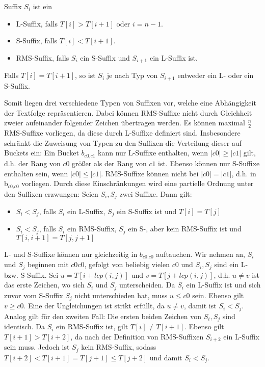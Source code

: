 \begin{definition}
	Suffix $S_i$ ist ein
	\begin{itemize}
		\item L-Suffix, falls $T[i] > T[i+1]$ oder $i=n-1$.
		\item S-Suffix, falls $T[i] < T[i+1]$.
		\item RMS-Suffix, falls $S_i$ ein S-Suffix und $S_{i+1}$ ein L-Suffix ist.
	\end{itemize}
	Falls $T[i] = T[i+1]$, so ist $S_i$ je nach Typ von $S_{i+1}$ entweder ein L- oder ein S-Suffix.
\end{definition}

Somit liegen drei verschiedene Typen von Suffixen vor, welche eine Abhängigkeit der Textfolge repräsentieren. Dabei können RMS-Suffixe nicht durch Gleichheit zweier aufeinander folgender Zeichen übertragen werden. Es können maximal $\frac{n}{2}$ RMS-Suffixe vorliegen, da diese durch L-Suffixe definiert sind. Insbesondere schränkt die Zuweisung von Typen zu den Suffixen die Verteilung dieser auf Buckets ein: Ein Bucket $b_{\textit{c0,c1}}$ kann nur L-Suffixe enthalten, wenn $|c0| \geq |c1|$ gilt, d.h. der Rang von $c0$ größer als der Rang von $c1$ ist. Ebenso können nur S-Suffixe enthalten sein, wenn $|c0| \leq |c1|$. RMS-Suffixe können nicht bei $|c0|=|c1|$, d.h. in b$_{\textit{c0,c0}}$ vorliegen.
Durch diese Einschränkungen wird eine partielle Ordnung unter den Suffixen erzwungen:
	Seien $S_i, S_j$ zwei Suffixe. Dann gilt:
	\begin{itemize}
		\item $S_i < S_j$, falls $S_i$ ein L-Suffix, $S_j$ ein S-Suffix ist und $T[i] = T[j]$
		\item $S_i < S_j$, falls $S_i$ ein RMS-Suffix, $S_j$ ein S-, aber kein RMS-Suffix ist und $T[i, i+1] = T[j, j+1]$
	\end{itemize}

	L- und S-Suffixe können nur gleichzeitig in $b_{\textit{c0,c0}}$ auftauchen. Wir nehmen an, $S_i$ und $S_j$ beginnen mit $c0c0$, gefolgt von beliebig vielen $c0$ und $S_i, S_j$ sind ein L- bzw. S-Suffix. Sei $u = T[i+lcp(i, j)]$ und $v = T[j+lcp(i, j)]$, d.h. $u \neq v$ ist das erste Zeichen, wo sich $S_i$ und $S_j$ unterscheiden. Da $S_i$ ein L-Suffix ist und sich zuvor vom S-Suffix $S_j$ nicht unterschieden hat, muss $u \leq c0$ sein. Ebenso gilt $v \geq c0$. Eine der Ungleichungen ist strikt erfüllt, da $u \neq v$, damit ist $S_i < S_j$.
	Analog gilt für den zweiten Fall: Die ersten beiden Zeichen von $S_i, S_j$ sind identisch. Da $S_i$ ein RMS-Suffix ist, gilt $T[i] \neq T[i+1]$. Ebenso gilt $T[i+1] > T[i+2]$, da nach der Definition von RMS-Suffixen $S_{i+2}$ ein L-Suffix sein muss. Jedoch ist $S_j$ kein RMS-Suffix, sodass $T[i+2] < T[i+1] =  T[j+1] \leq T[j+2]$ und damit $S_i < S_j$. 

